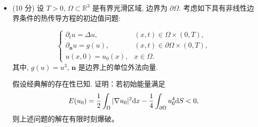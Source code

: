 \begin{itemize}
(a) (30 分) 运用算子半群方法讨论上述问题在适当函数空间中的适定性.

(b) (10 分) 假设初值满足 $u_{0}, v_{0} \geq 0$, 解是否也非负?

\item[三.] (10 分) 设 $T>0$, $\Omega \subset \mathbb{R}^{3}$ 是有界光滑区域, 
边界为 $\partial \Omega$. 考虑如下具有非线性边界条件的热传导方程的初边值问题:

$$\begin{cases}\partial_{t} u=\Delta u, & (x, t) \in \Omega \times(0, T), \\ 
    \partial_{\boldsymbol{n}} u=g(u), & (x, t) \in \partial \Omega \times(0, T), \\ 
    u(x, 0)=u_{0}(x), & x \in \Omega .\end{cases}$$
其中, $g(u)=u^{3}$, $\boldsymbol{n}$ 是边界上的单位外法向量.

\qquad 假设经典解的存在性已知. 证明：若初始能量满足
$$E(u_{0})=\frac{1}{2} \int_{\Omega}|\nabla u_{0}|^{2} {\rm d} x
-\frac{1}{4} \int_{\partial \Omega} u_{0}^{4} {\rm d} S<0,$$
则上述问题的解在有限时刻爆破。
\end{itemize}